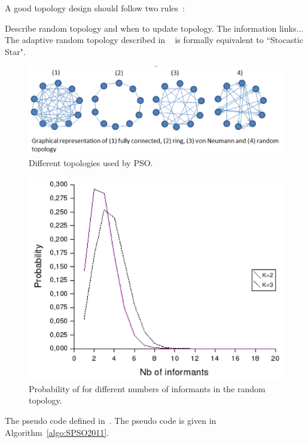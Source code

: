 A good topology design should follow two rules~\cite{Clerc:2007:randomTopology}:

Describe random topology and when to update topology.
The information links...  The adaptive random topology described in ~\cite{Clerc:2007:randomTopology} is formally equivalent to ``Stocastic Star".  

\begin{figure}[!t] \centering
\includegraphics[width=\textwidth]{SPSO_topology}
\caption{Different topologies used by PSO.}\label{fig:SPSO_topology}
\end{figure} 

\begin{figure}[!t] \centering
\includegraphics[width=\textwidth]{SPSO_prob_informant}
\caption{Probability of for different numbers of informants in the random topology.}\label{fig:SPSO_prob_informant}
\end{figure} 

The pseudo code defined in~\cite{Zambrano:2013:SPSO2011}.
The pseudo code is given in Algorithm~\ref{algo:SPSO2011}.



